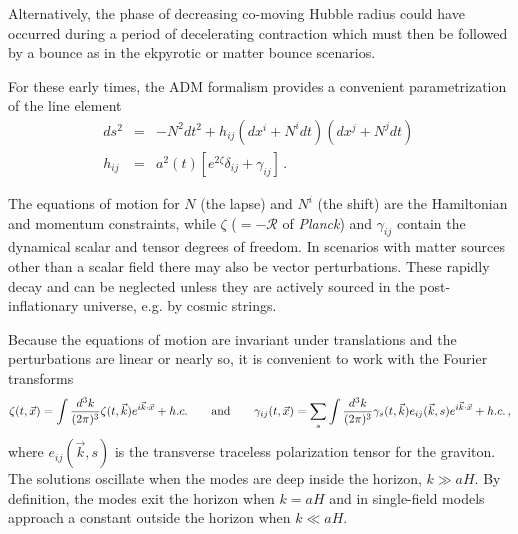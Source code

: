 
Alternatively, the phase of decreasing co-moving Hubble radius could have occurred during a period of decelerating contraction which must then be followed by a bounce as in the ekpyrotic or matter bounce scenarios. 

For these early times, the ADM formalism provides a convenient parametrization of the line element
\begin{eqnarray}
\label{eq:metric}
ds^2&=&-N^2dt^2 +h_{ij}(dx^i+N^idt)(dx^j+N^jdt)\,\nonumber\\
h_{ij}&=&a^2(t)[e^{2\zeta}\delta_{ij}+\gamma_{ij}]\,.
\end{eqnarray}

The equations of motion for $N$ (the lapse) and $N^i$ (the shift) are the Hamiltonian and momentum constraints, while $\zeta$ ($=-\mathcal{R}$ of {\it Planck}) and $\gamma_{ij}$ contain the dynamical scalar and tensor degrees of freedom. In scenarios with matter sources other than a scalar field there may also be vector perturbations. These rapidly decay and can be neglected unless they are actively sourced in the post-inflationary universe, e.g. by cosmic strings.

Because the equations of motion are invariant under translations and the perturbations are linear or nearly so, it is convenient to work with the Fourier transforms
\begin{equation}
\zeta(t,\vec{x})=\int \frac{d^3 k}{(2\pi)^3}\zeta(t,\vec{k})e^{i \vec{k}\cdot\vec{x}}+h.c.\qquad{\rm and}\qquad\gamma_{ij}(t,\vec{x})=\sum\limits_s\int\frac{d^3k}{(2\pi)^3}\gamma_s(t,\vec{k})e_{ij}(\vec{k},s)e^{i \vec{k}\cdot\vec{x}}+h.c.\,,
\end{equation}
where $e_{ij}(\vec{k},s)$ is the transverse traceless polarization tensor for the graviton. The solutions oscillate when the modes are deep inside the horizon, $k\gg aH$. By definition, the modes exit the horizon when $k=aH$ and in single-field models approach a constant outside the horizon when $k\ll aH$.

